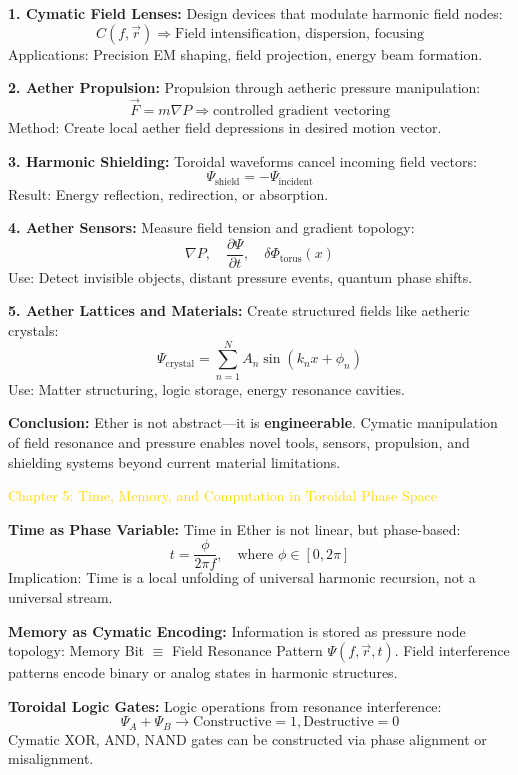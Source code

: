 \textbf{1. Cymatic Field Lenses:}
Design devices that modulate harmonic field nodes:
\[
C(f, \vec{r}) \Rightarrow \text{Field intensification, dispersion, focusing}
\]
Applications: Precision EM shaping, field projection, energy beam formation.

\textbf{2. Aether Propulsion:}
Propulsion through aetheric pressure manipulation:
\[
\vec{F} = m \nabla P \Rightarrow \text{controlled gradient vectoring}
\]
Method: Create local aether field depressions in desired motion vector.

\textbf{3. Harmonic Shielding:}
Toroidal waveforms cancel incoming field vectors:
\[
\Psi_{\text{shield}} = -\Psi_{\text{incident}}
\]
Result: Energy reflection, redirection, or absorption.

\textbf{4. Aether Sensors:}
Measure field tension and gradient topology:
\[
\nabla P, \quad \frac{\partial \Psi}{\partial t}, \quad \delta \Phi_{\text{torus}}(x)
\]
Use: Detect invisible objects, distant pressure events, quantum phase shifts.

\textbf{5. Aether Lattices and Materials:}
Create structured fields like aetheric crystals:
\[
\Psi_{\text{crystal}} = \sum_{n=1}^N A_n \sin \left( k_n x + \phi_n \right)
\]
Use: Matter structuring, logic storage, energy resonance cavities.

\textbf{Conclusion:}
Ether is not abstract—it is \textbf{engineerable}. Cymatic manipulation of field resonance and pressure enables novel tools, sensors, propulsion, and shielding systems beyond current material limitations.

\textcolor{gold}{ Chapter 5: Time, Memory, and Computation in Toroidal Phase Space }

\textbf{Time as Phase Variable:}
Time in Ether is not linear, but phase-based:
\[
t = \frac{\phi}{2 \pi f}, \quad \text{where } \phi \in [0, 2 \pi]
\]
Implication: Time is a local unfolding of universal harmonic recursion, not a universal stream.

\textbf{Memory as Cymatic Encoding:}
Information is stored as pressure node topology: Memory Bit $\equiv$ Field Resonance Pattern $\Psi(f, \vec{r}, t)$. Field interference patterns encode binary or analog states in harmonic structures.

\textbf{Toroidal Logic Gates:}
Logic operations from resonance interference:
\[
\Psi_A + \Psi_B \to \text{Constructive} = 1, \text{Destructive} = 0
\]
Cymatic XOR, AND, NAND gates can be constructed via phase alignment or misalignment.

